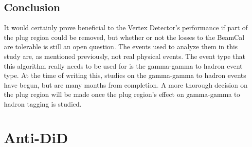 \documentclass{report}
\begin{document}
            \subsection{Conclusion} 
                 It would certainly prove beneficial to the Vertex Detector's performance if part of the plug region could be removed, but whether or not the losses to the BeamCal are tolerable is still an open question. The events used to analyze them in this study are, as mentioned previously, not real physical events. The event type that this algorithm really needs to be used for is the gamma-gamma to hadron event type. At the time of writing this, studies on the gamma-gamma to hadron events have begun, but are many months from completion. A more thorough decision on the plug region will be made once the plug region's effect on gamma-gamma to hadron tagging is studied.

        
        \section{Anti-DiD}
\end{document}
